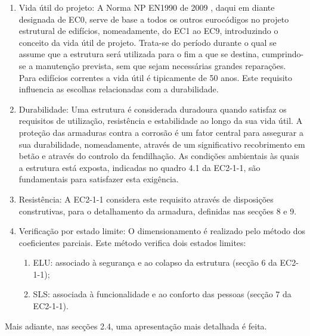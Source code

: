 \begin{enumerate}
        \item Vida útil do projeto:
A Norma NP EN1990 de 2009 \cite{EN1990}, daqui em diante designada de EC0, serve de base a todos os outros eurocódigos no projeto estrutural de edifícios, nomeadamente, do EC1 ao EC9, introduzindo o conceito da vida útil de projeto. Trata-se do período durante o qual se assume que a estrutura será utilizada para o fim a que se destina, cumprindo-se a manutenção prevista, sem que sejam necessárias grandes reparações. Para edifícios correntes a vida útil é tipicamente de 50 anos. Este requisito influencia as escolhas relacionadas com a durabilidade.

        \item Durabilidade:
Uma estrutura é considerada duradoura quando satisfaz os requisitos de utilização, resistência e estabilidade ao longo da sua vida útil. A proteção das armaduras contra a corrosão é um fator central para assegurar a sua durabilidade, nomeadamente, através de um significativo recobrimento em betão e através do controlo da fendilhação. As condições ambientais às quais a estrutura está exposta, indicadas no quadro 4.1 da EC2-1-1, são fundamentais para satisfazer esta exigência.

        \item  Resistência:
A EC2-1-1 considera este requisito através de disposições construtivas, para o detalhamento da armadura, definidas nas secções 8 e 9.
    
        \item  Verificação por estado limite:
O dimensionamento é realizado pelo método dos coeficientes parciais. Este método verifica dois estados limites:
        \begin{enumerate}
            \item ELU: associado à segurança e ao colapso da estrutura (secção 6 da EC2-1-1);
            \item SLS: associada à funcionalidade e ao conforto das pessoas (secção 7 da EC2-1-1).
\end{enumerate}
\end{enumerate}

Mais adiante, nas secções 2.4, uma apresentação mais detalhada é feita.

